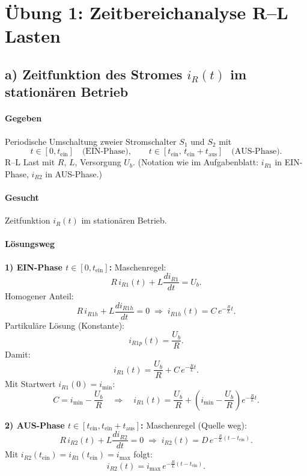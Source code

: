 \section{Übung 1: Zeitbereichanalyse R--L Lasten}

\subsection*{a) Zeitfunktion des Stromes $i_R(t)$ im stationären Betrieb}

\paragraph{Gegeben}
Periodische Umschaltung zweier Stromschalter $S_1$ und $S_2$ mit
\[
t\in[0,t_\mathrm{ein}] \quad \text{(EIN-Phase)}, 
\qquad
t\in[t_\mathrm{ein},\,t_\mathrm{ein}+t_\mathrm{aus}] \quad \text{(AUS-Phase)}.
\]
R--L Last mit $R$, $L$, Versorgung $U_b$.
(Notation wie im Aufgabenblatt: $i_{R1}$ in EIN-Phase, $i_{R2}$ in AUS-Phase.)

\paragraph{Gesucht}
Zeitfunktion $i_R(t)$ im stationären Betrieb.

\paragraph{Lösungsweg}
\textbf{1) EIN-Phase $t\in[0,t_\mathrm{ein}]$:}
Maschenregel:
\[
R\,i_{R1}(t) + L\frac{di_{R1}}{dt} = U_b.
\]
Homogener Anteil:
\[
R\,i_{R1h}+L\frac{di_{R1h}}{dt}=0
\;\Rightarrow\;
i_{R1h}(t)=C\,e^{-\frac{R}{L}t}.
\]
Partikuläre Lösung (Konstante):
\[
i_{R1p}(t)=\frac{U_b}{R}.
\]
Damit:
\[
i_{R1}(t)=\frac{U_b}{R}+C\,e^{-\frac{R}{L}t}.
\]
Mit Startwert $i_{R1}(0)=i_\mathrm{min}$:
\[
C=i_\mathrm{min}-\frac{U_b}{R}
\quad\Rightarrow\quad
\boxed{
i_{R1}(t)=\frac{U_b}{R}+\left(i_\mathrm{min}-\frac{U_b}{R}\right)e^{-\frac{R}{L}t}
}.
\]

\textbf{2) AUS-Phase $t\in[t_\mathrm{ein},t_\mathrm{ein}+t_\mathrm{aus}]$:}
Maschenregel (Quelle weg):
\[
R\,i_{R2}(t) + L\frac{di_{R2}}{dt} = 0
\;\Rightarrow\;
\boxed{
i_{R2}(t)=D\,e^{-\frac{R}{L}(t-t_\mathrm{ein})}
}.
\]
Mit $i_{R2}(t_\mathrm{ein})=i_{R1}(t_\mathrm{ein})=i_\mathrm{max}$ folgt:
\[
\boxed{
i_{R2}(t)=i_\mathrm{max}\,e^{-\frac{R}{L}(t-t_\mathrm{ein})}
}.
\]

